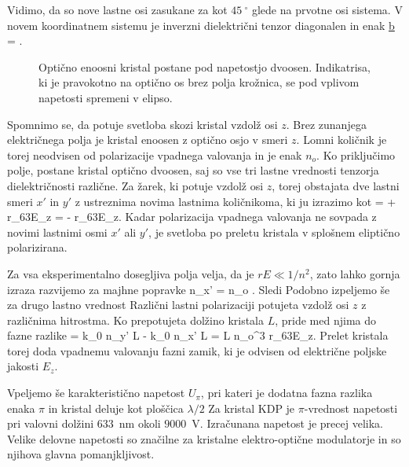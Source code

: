 Vidimo, da so nove lastne osi zasukane za kot $45~^\circ$ glede na prvotne osi sistema.
V novem koordinatnem sistemu je inverzni dielektrični tenzor diagonalen in enak
\beq
\underline{b} = 
.
\eeq
\begin{figure}[h]
\centering
\def\svgwidth{60truemm} 

\caption{Optično enoosni kristal postane pod napetostjo dvoosen. Indikatrisa, ki je pravokotno
na optično os brez polja krožnica, se pod vplivom napetosti spremeni v elipso. }
\label{fig:amn}
\end{figure}

Spomnimo se, da potuje svetloba skozi kristal vzdolž osi $z$. Brez zunanjega električnega
polja je kristal enoosen z optično osjo v smeri $z$. Lomni količnik je torej neodvisen od
polarizacije vpadnega valovanja in je enak $n_o$. Ko priključimo polje, postane kristal
optično dvoosen, saj so vse tri lastne vrednosti tenzorja dielektričnosti različne. Za žarek, 
ki potuje vzdolž osi $z$, torej obstajata dve lastni smeri $x'$ in $y'$ z ustreznima
novima lastnima količnikoma, ki ju izrazimo kot
\beq
{} = + r_{63}E_z \quad {} \quad 
{} = - r_{63}E_z. 
\eeq
Kadar polarizacija vpadnega valovanja ne sovpada z novimi lastnimi osmi $x'$ ali $y'$, je 
svetloba po preletu kristala v splošnem eliptično polarizirana.

Za vsa eksperimentalno dosegljiva polja velja, da je $rE\ll1/n^2$, 
zato lahko gornja izraza razvijemo za majhne popravke
\beq
n_{x'} =  \approx n_o .
\eeq
Sledi
Podobno izpeljemo še za drugo lastno vrednost
Različni lastni polarizaciji potujeta vzdolž osi $z$ z različnima hitrostma. Ko 
prepotujeta dolžino kristala $L$, pride med njima do fazne razlike
\beq
\Delta \phi = k_0 n_{y'} L - k_0 n_{x'} L = L 
n_o^3 r_{63}E_z.
\label{phiAM}
\eeq
Prelet kristala torej doda vpadnemu valovanju fazni zamik, ki je odvisen od električne poljske
jakosti $E_z$. 

Vpeljemo še karakteristično napetost $U_\pi$, pri kateri je dodatna 
fazna razlika enaka $\pi$ in kristal deluje kot ploščica $\lambda/2$
Za kristal KDP je $\pi$-vrednost napetosti pri valovni dolžini $633$~nm okoli  $9000$~V. 
Izračunana napetost je precej velika. Velike delovne napetosti
so značilne za kristalne elektro-optične modulatorje in so njihova
glavna pomanjkljivost. 


